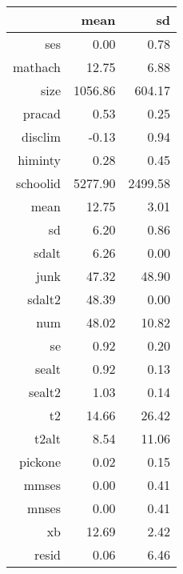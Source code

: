 \begin{tabular}{rrr}
  \hline
 & mean & sd \\ 
  \hline
ses & 0.00 & 0.78 \\ 
  mathach & 12.75 & 6.88 \\ 
  size & 1056.86 & 604.17 \\ 
  pracad & 0.53 & 0.25 \\ 
  disclim & -0.13 & 0.94 \\ 
  himinty & 0.28 & 0.45 \\ 
  schoolid & 5277.90 & 2499.58 \\ 
  mean & 12.75 & 3.01 \\ 
  sd & 6.20 & 0.86 \\ 
  sdalt & 6.26 & 0.00 \\ 
  junk & 47.32 & 48.90 \\ 
  sdalt2 & 48.39 & 0.00 \\ 
  num & 48.02 & 10.82 \\ 
  se & 0.92 & 0.20 \\ 
  sealt & 0.92 & 0.13 \\ 
  sealt2 & 1.03 & 0.14 \\ 
  t2 & 14.66 & 26.42 \\ 
  t2alt & 8.54 & 11.06 \\ 
  pickone & 0.02 & 0.15 \\ 
  mmses & 0.00 & 0.41 \\ 
  mnses & 0.00 & 0.41 \\ 
  xb & 12.69 & 2.42 \\ 
  resid & 0.06 & 6.46 \\ 
   \hline
\end{tabular}
